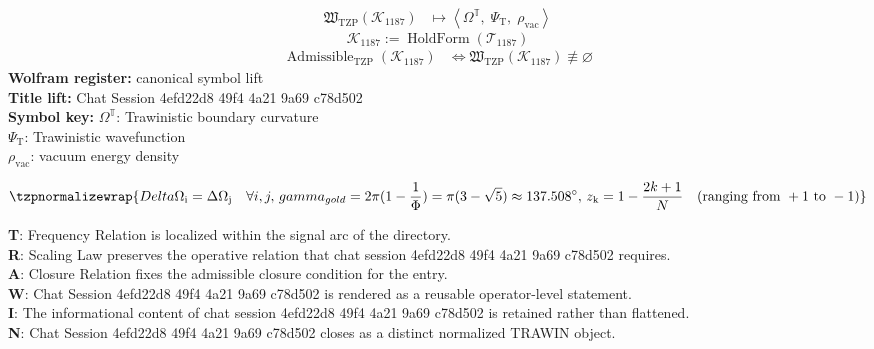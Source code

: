 \noindent
\begin{minipage}[t]{0.48\linewidth}
\begingroup
\small
\[
\begin{aligned}
\mathfrak{W}_{\mathrm{TZP}}\!\left(\mathcal{K}_{1187}\right)
&\longmapsto
\left\langle \Omega^{\mathbb{T}},\; \Psi_{\mathrm{T}},\; \rho_{\mathrm{vac}} \right\rangle
\end{aligned}
\]
\[
\mathcal{K}_{1187}
:=
\operatorname{HoldForm}\!\left(\mathcal{T}_{1187}\right)
\]
\[
\begin{aligned}
\operatorname{Admissible}_{\mathrm{TZP}}\!\left(\mathcal{K}_{1187}\right)
&\Longleftrightarrow
\mathfrak{W}_{\mathrm{TZP}}\!\left(\mathcal{K}_{1187}\right)\not\equiv\varnothing
\end{aligned}
\]
\textbf{Wolfram register:} canonical symbol lift\\
\textbf{Title lift:} Chat Session 4efd22d8 49f4 4a21 9a69 c78d502\\
\textbf{Symbol key:} \(\Omega^{\mathbb{T}}\): Trawinistic boundary curvature\\ \(\Psi_{\mathrm{T}}\): Trawinistic wavefunction\\ \(\rho_{\mathrm{vac}}\): vacuum energy density
\par
\endgroup
\end{minipage}\hfill
\begin{minipage}[t]{0.48\linewidth}
\[
\tzpnormalizewrap{Delta \Omega_{\mathrm{i}} = \Delta \Omega_{\mathrm{j}} \quad \forall i, j,\,gamma_{gold} = 2\pi (1 - \frac{1}{\Phi}) = \pi(3 - \sqrt{5}) \approx 137.508^\circ,\,z_{\mathrm{k}} = 1 - \frac{2k+1}{N} \quad (\text{ranging from } +1 \text{ to } -1)}
\]

\small
\textbf{T}: Frequency Relation is localized within the signal arc of the directory.\\
\textbf{R}: Scaling Law preserves the operative relation that chat session 4efd22d8 49f4 4a21 9a69 c78d502 requires.\\
\textbf{A}: Closure Relation fixes the admissible closure condition for the entry.\\
\textbf{W}: Chat Session 4efd22d8 49f4 4a21 9a69 c78d502 is rendered as a reusable operator-level statement.\\
\textbf{I}: The informational content of chat session 4efd22d8 49f4 4a21 9a69 c78d502 is retained rather than flattened.\\
\textbf{N}: Chat Session 4efd22d8 49f4 4a21 9a69 c78d502 closes as a distinct normalized TRAWIN object.
\normalsize
\end{minipage}

